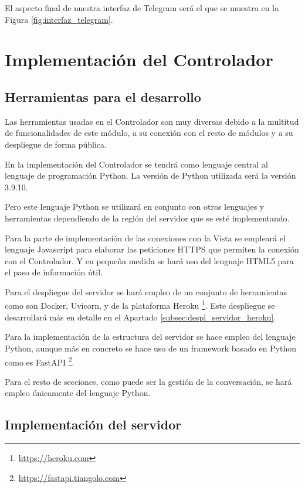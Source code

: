 El aspecto final de nuestra interfaz de Telegram será el que se muestra en la Figura \ref{fig:interfaz_telegram}.


\section{Implementación del Controlador}

\subsection{Herramientas para el desarrollo} \label{subsec:herramientas_controlador}

Las herramientas usadas en el Controlador son muy diversas debido a la multitud de funcionalidades de este módulo, a su conexión con el resto de módulos y a su despliegue de forma pública.

En la implementación del Controlador se tendrá como lenguaje central al lenguaje de programación Python. La versión de Python utilizada será la versión 3.9.10.

Pero este lenguaje Python se utilizará en conjunto con otros lenguajes y herramientas dependiendo de la región del servidor que se esté implementando.

Para la parte de implementación de las conexiones con la Vista se empleará el lenguaje Javascript para elaborar las peticiones HTTPS que permiten la conexión con el Controlador. Y en pequeña medida se hará uso del lenguaje HTML5 para el paso de información útil.

Para el despliegue del servidor se hará empleo de un conjunto de herramientas como son Docker, Uvicorn, y de la plataforma Heroku \footnote{\url{https://heroku.com}}. Este despliegue se desarrollará más en detalle en el Apartado \ref{subsec:despl_servidor_heroku}.

Para la implementación de la estructura del servidor se hace empleo del lenguaje Python, aunque más en concreto se hace uso de un \gls{framework} basado en Python como es FastAPI \footnote{\url{https://fastapi.tiangolo.com}}.

Para el resto de secciones, como puede ser la gestión de la conversación, se hará empleo únicamente del lenguaje Python.

\subsection{Implementación del servidor} \label{subsec:implementacion_controlador}

